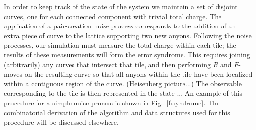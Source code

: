\documentclass[aps, prl, letterpaper, twocolumn, superscriptaddress, notitlepage, 10pt]{revtex4-1}
\newcommand{\Fref}[1]{Fig.~\ref{#1}}
\newcommand{\cggb}[1]{\textcolor{blue}{#1}}
\begin{document}
In order to keep track of the state of the system we maintain a set of disjoint curves, 
one for each connected component with trivial total charge.
The application of a pair-creation noise process corresponds to the 
addition of an extra piece of curve to the lattice supporting
two new anyons.
Following the noise processes, our simulation must %
measure the total charge within each tile; the results of 
these measurements will form the error syndrome. 
This requires joining (arbitrarily) any curves that intersect that tile, 
and then performing $R$ and $F$-moves on the resulting
curve so that 
all anyons within the tile have been 
localized within a contiguous region of the curve. 
(Heisenberg picture...)
The observable corresponding to the tile is then
represented in the state ...
An example of this 
procedure for a simple noise process is shown in \Fref{f:syndrome}.
The combinatorial derivation of the algorithm and data structures used for 
this procedure will be discussed elsewhere.
\end{document}
